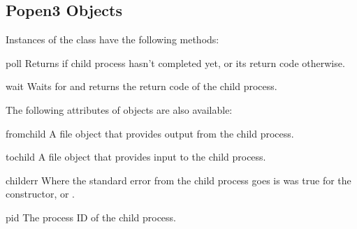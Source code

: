 \subsection{Popen3 Objects \label{popen3-objects}}

Instances of the  class have the following methods:

\begin{methoddesc}{poll}{}
Returns  if child process hasn't completed yet, or its return 
code otherwise.
\end{methoddesc}

\begin{methoddesc}{wait}{}
Waits for and returns the return code of the child process.
\end{methoddesc}


The following attributes of  objects are also available: 

\begin{memberdesc}{fromchild}
A file object that provides output from the child process.
\end{memberdesc}

\begin{memberdesc}{tochild}
A file object that provides input to the child process.
\end{memberdesc}

\begin{memberdesc}{childerr}
Where the standard error from the child process goes is
 was true for the constructor, or .
\end{memberdesc}

\begin{memberdesc}{pid}
The process ID of the child process.
\end{memberdesc}
